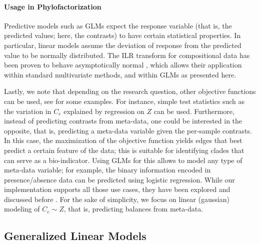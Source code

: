 \paragraph{Usage in Phylofactorization}
\label{sec:Factorization:sub:Methods:sub:ObjectiveFunction:par:Usage}

Predictive models such as \acp{GLM} expect the response variable (that is, the predicted values; here, the contrasts)
to have certain statistical properties.
In particular, linear models assume the deviation of response from the predicted value to be normally distributed.
The ILR transform for compositional data has been proven to behave asymptotically normal \cite{Egozcue2003,Pawlowsky-Glahn2011a},
which allows their application within standard multivariate methods,
and within \acp{GLM} as presented here.

Lastly, we note that depending on the research question, other objective functions can be used,
see \cite{Washburne2017a,Washburne2018} for some examples.
For instance, simple test statistics such as the variation in $C_e$ explained by regression on $Z$ can be used.
Furthermore, instead of predicting contrasts from meta-data, one could be interested in the opposite,
that is, predicting a meta-data variable given the per-sample contrasts.
In this case, the maximization of the objective function yields edges that best predict a certain feature of the data;
this is suitable for identifying clades that can serve as a bio-indicator.
Using \acp{GLM} for this allows to model any type of meta-data variable;
for example, the binary information encoded in presence/absence data can be predicted using logistic regression.
While our implementation supports all those use cases,
they have been explored and discussed before \cite{Washburne2017a,Washburne2019}.
For the sake of simplicity, we focus on linear (gaussian) modeling of $C_e \sim Z$,
that is, predicting balances from meta-data.


\subsection{Generalized Linear Models}
\label{sec:Factorization:sub:Methods:sub:GLMs}

